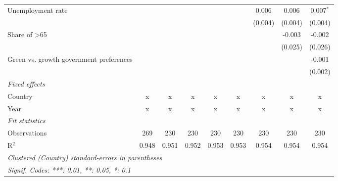 \begin{table}[htbp]
\begin{tabular}{lcccccccc}
      Unemployment rate                                &              &             &         &         &         & 0.006   & 0.006   & 0.007$^{*}$\\   
                                                       &              &             &         &         &         & (0.004) & (0.004) & (0.004)\\   
      Share of >65                                     &              &             &         &         &         &         & -0.003  & -0.002\\   
                                                       &              &             &         &         &         &         & (0.025) & (0.026)\\   
      Green vs. growth government preferences          &              &             &         &         &         &         &         & -0.001\\   
                                                       &              &             &         &         &         &         &         & (0.002)\\   
      \emph{Fixed effects}\\
      Country                                          & x            & x           & x       & x       & x       & x       & x       & x\\  
      Year                                             & x            & x           & x       & x       & x       & x       & x       & x\\  
      \midrule \emph{Fit statistics}\\
      Observations                                     & 269          & 230         & 230     & 230     & 230     & 230     & 230     & 230\\  
      R$^2$                                            & 0.948        & 0.951       & 0.952   & 0.953   & 0.953   & 0.954   & 0.954   & 0.954\\  
      \midrule
      \multicolumn{9}{l}{\emph{Clustered (Country) standard-errors in parentheses}}\\
      \multicolumn{9}{l}{\emph{Signif. Codes: ***: 0.01, **: 0.05, *: 0.1}}\\
   \end{tabular}
\end{table}


